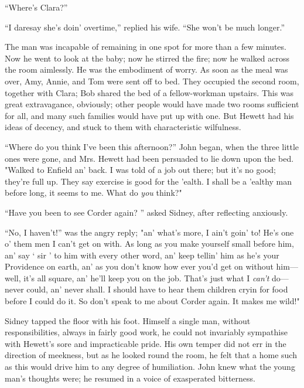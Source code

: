 ``Where's Clara?''

``I daresay she's doin' overtime,'' replied his wife. ``She won't be
much longer.''

The man was incapable of remaining in one spot for more than a few
minutes. Now he went to look at the baby; now he stirred the fire; now
he walked across the room aimlessly. He was the embodiment of worry. As
soon as the meal was over, Amy, Annie, and Tom were sent off to bed.
They occupied the second room, together with Clara; Bob shared the bed
of a fellow-workman upstairs. This was great extravagance, obviously;
other people would have made two rooms sufficient for all, and many such
families would have put up with one. But Hewett had his ideas of
decency, and stuck to them with characteristic wilfulness.

``Where do you think I've been this afternoon?'' John began, when the
three little ones were gone, and Mrs. Hewett had
{\protect\hypertarget{51}{}{}}been persuaded to lie down upon the bed.
"Walked to Enfield an' back. I was told of a job out there; but it's no
good; they're full up. They say exercise is good for the 'ealth. I shall
be a 'ealthy man before long, it seems to me. What do \emph{you} think?"

``Have you been to see Corder again? '' asked Sidney, after reflecting
anxiously.

``No, I haven't!'' was the angry reply; "an' what's more, I ain't goin'
to! He's one o' them men I can't get on with. As long as you make
yourself small before him, an' say ` sir ' to him with every other word,
an' keep tellin' him as he's your Providence on earth, an' as you don't
know how ever you'd get on without him---well, it's all square, an'
he'll keep you on the job. That's just what I \emph{can't} do---never
could, an' never shall. I should have to hear them children cryin for
food before I could do it. So don't speak to me about Corder again. It
makes me wild!"

Sidney tapped the floor with his foot. Himself a single man, without
responsibilities, always in fairly good work, he could not
{\protect\hypertarget{52}{}{}}invariably sympathise with Hewett's sore
and impracticable pride. His own temper did not err in the direction of
meekness, but as he looked round the room, he felt that a home such as
this would drive him to any degree of humiliation. John knew what the
young man's thoughts were; he resumed in a voice of exasperated
bitterness.

